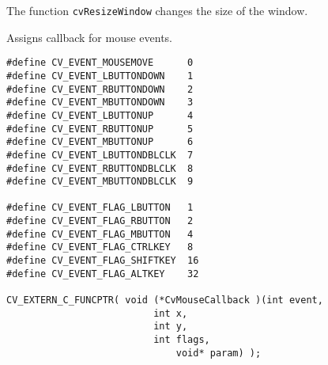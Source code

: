 The function \texttt{cvResizeWindow} changes the size of the window.

Assigns callback for mouse events.


\begin{lstlisting}
#define CV_EVENT_MOUSEMOVE      0
#define CV_EVENT_LBUTTONDOWN    1
#define CV_EVENT_RBUTTONDOWN    2
#define CV_EVENT_MBUTTONDOWN    3
#define CV_EVENT_LBUTTONUP      4
#define CV_EVENT_RBUTTONUP      5
#define CV_EVENT_MBUTTONUP      6
#define CV_EVENT_LBUTTONDBLCLK  7
#define CV_EVENT_RBUTTONDBLCLK  8
#define CV_EVENT_MBUTTONDBLCLK  9

#define CV_EVENT_FLAG_LBUTTON   1
#define CV_EVENT_FLAG_RBUTTON   2
#define CV_EVENT_FLAG_MBUTTON   4
#define CV_EVENT_FLAG_CTRLKEY   8
#define CV_EVENT_FLAG_SHIFTKEY  16
#define CV_EVENT_FLAG_ALTKEY    32

CV_EXTERN_C_FUNCPTR( void (*CvMouseCallback )(int event, 
					      int x, 
					      int y, 
					      int flags, 
				              void* param) );
\end{lstlisting}

\begin{description}

\end{description}

